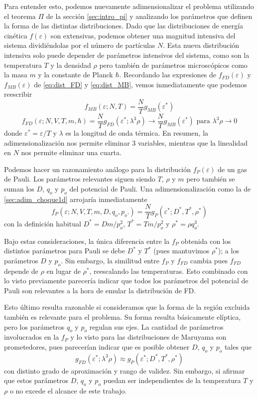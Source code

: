 
Para entender esto, podemos nuevamente adimensionalizar el problema utilizando el teorema $\Pi$ de la sección \ref{sec:intro_pi} y analizando los parámetros que definen la forma de las distintas distribuciones.
Dado que las distribuciones de energía cinética $f(\varepsilon)$ son extensivas, podemos obtener una magnitud intensiva del sistema dividiéndolas por el número de partículas $N$.
Esta nueva distribución intensiva solo puede depender de parámetros intensivos del sistema, como son la temperatura $T$ y la densidad $\rho$ pero también de parámetros microscópicos como
la masa $m$ y la constante de Planck $\hbar$.
Recordando las expresiones de $f_{FD}(\varepsilon)$ y $f_{MB}(\varepsilon)$ de \eqref{eq:dist_FD} y \eqref{eq:dist_MB}, vemos inmediatamente que podemos reescribir
\[ f_{MB}(\varepsilon;N,T) = \frac{N}{T}g_{MB}(\varepsilon^*) \]
\[ f_{FD}(\varepsilon;N, V, T, m, \hbar) = \frac{N}{T}g_{FD}(\varepsilon^*;\lambda^3\rho) \to \frac{N}{T}g_{MB}(\varepsilon^*) \text{ para } \lambda^3\rho\to0 \]
donde $\varepsilon^* = \varepsilon/T$ y $\lambda$ es la longitud de onda térmica.
En resumen, la adimensionalización nos permite eliminar 3 variables, mientras que la linealidad en $N$ nos permite eliminar una cuarta.

Podemos hacer un razonamiento análogo para la distribución $f_P(\varepsilon)$ de un gas de Pauli.
Los parámetros relevantes siguen siendo $T$, $\rho$ y $m$ pero también se suman los $D$, $q_o$ y $p_o$ del potencial de Pauli.
Una adimensionalización como la de \ref{sec:adim_choque1d} arrojaría inmediatamente
\[ f_P(\varepsilon; N,V,T, m, D, q_o,p_o.) = \frac{N}{T}g_P(\varepsilon^*; D^*, T^*, \rho^*)\]
con la definición habitual $D^*=Dm/p_o^2$, $T^*=Tm/p_o^2$ y $\rho^* = \rho q_o^3$.

Bajo estas consideraciones, la única diferencia entre la $f_P$ obtenida con los distintos parámetros para Pauli se debe $D^*$ y $T^*$ (pues mantuvimos $\rho^*$); a los parámetros $D$ y $p_o$.
Sin embargo, la similitud entre $f_P$ y $f_{FD}$ cambia pues $f_{FD}$ depende de $\rho$ en lugar de $\rho^*$, reescalando las temperaturas.
Esto combinado con lo visto previamente parecería indicar que todos los parámetros del potencial de Pauli son relevantes a la hora de emular la distribución de FD.

Esto último resulta razonable si consideramos que la forma de la región excluida también es relevante para el problema.
Su forma resulta básicamente elíptica, pero los parámetros $q_o$ y $p_o$ regulan sus ejes.
La cantidad de parámetros involucrados en la $f_P$ y lo visto para las distribuciones de Maruyama son prometedores, pues parecerían indicar que es posible obtener $D$, $q_o$ y $p_o$ tales que
\[ g_{FD}(\varepsilon^*;\lambda^3\rho) \approx g_P(\varepsilon^*; D^*, T^*, \rho^*) \]
con distinto grado de aproximación y rango de validez.
Sin embargo, si afirmar que estos parámetros $D$, $q_o$ y $p_o$ puedan ser independientes de la temperatura $T$ y $\rho$ o no excede el alcance de este trabajo.

